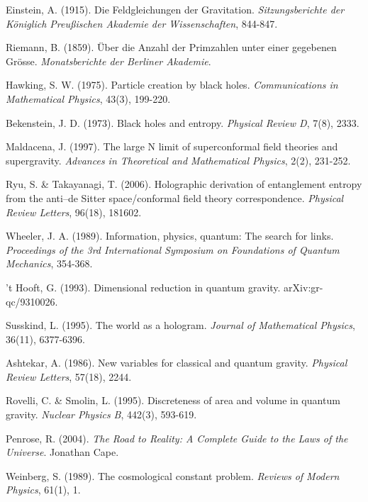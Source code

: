 \documentclass[12pt,a4paper]{article}
\begin{document}
\begin{thebibliography}{99}

Einstein, A. (1915).
Die Feldgleichungen der Gravitation.
\textit{Sitzungsberichte der Königlich Preußischen Akademie der Wissenschaften}, 844-847.

Riemann, B. (1859).
Über die Anzahl der Primzahlen unter einer gegebenen Grösse.
\textit{Monatsberichte der Berliner Akademie}.

Hawking, S. W. (1975).
Particle creation by black holes.
\textit{Communications in Mathematical Physics}, 43(3), 199-220.

Bekenstein, J. D. (1973).
Black holes and entropy.
\textit{Physical Review D}, 7(8), 2333.

Maldacena, J. (1997).
The large N limit of superconformal field theories and supergravity.
\textit{Advances in Theoretical and Mathematical Physics}, 2(2), 231-252.

Ryu, S. \& Takayanagi, T. (2006).
Holographic derivation of entanglement entropy from the anti–de Sitter space/conformal field theory correspondence.
\textit{Physical Review Letters}, 96(18), 181602.

Wheeler, J. A. (1989).
Information, physics, quantum: The search for links.
\textit{Proceedings of the 3rd International Symposium on Foundations of Quantum Mechanics}, 354-368.

't Hooft, G. (1993).
Dimensional reduction in quantum gravity.
arXiv:gr-qc/9310026.

Susskind, L. (1995).
The world as a hologram.
\textit{Journal of Mathematical Physics}, 36(11), 6377-6396.

Ashtekar, A. (1986).
New variables for classical and quantum gravity.
\textit{Physical Review Letters}, 57(18), 2244.

Rovelli, C. \& Smolin, L. (1995).
Discreteness of area and volume in quantum gravity.
\textit{Nuclear Physics B}, 442(3), 593-619.

Penrose, R. (2004).
\textit{The Road to Reality: A Complete Guide to the Laws of the Universe}.
Jonathan Cape.

Weinberg, S. (1989).
The cosmological constant problem.
\textit{Reviews of Modern Physics}, 61(1), 1.


\end{thebibliography}
\end{document}
